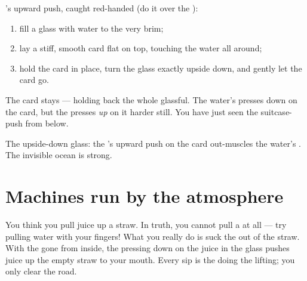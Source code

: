 \begin{method}\label{met:g5:air-pressure-weather:card}
's upward push, caught red-handed (do it over the ):
\begin{enumerate}
  \item fill a glass with water to the very brim;
  \item lay a stiff, smooth card flat on top, touching the water
        all around;
  \item hold the card in place, turn the glass exactly upside
        down, and gently let the card go.
\end{enumerate}
The card stays --- holding back the whole glassful. The water's
 presses down on the card, but the  presses
\emph{up} on it harder still. You have just seen the suitcase-push
from below.
\end{method}

\begin{omfigure}

{\small The upside-down glass: the 's upward push on the card
out-muscles the water's . The invisible ocean is strong.}
\end{omfigure}

\section{Machines run by the atmosphere}

\begin{example}\label{ex:g5:air-pressure-weather:straw}
You think you pull juice up a straw. In truth, you cannot pull a
 at all --- try pulling water with your fingers! What you
really do is suck the \emph{} out of the straw. With the 
gone from inside, the  pressing down on the juice in the
glass pushes juice up the empty straw to your mouth. Every sip is
the  doing the lifting; you only clear the road.
\end{example}

